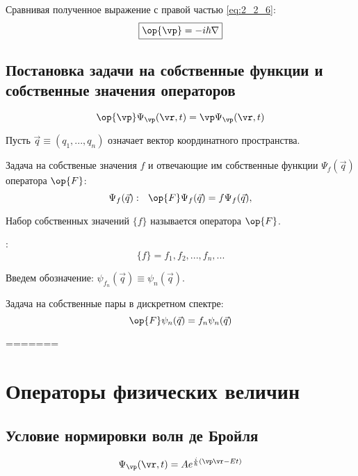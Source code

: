 Сравнивая полученное выражение с правой частью \eqref{eq:2_2_6}:
\begin{equation}
\label{eq:2_2_7}
\boxed{ \op{\vp} = -i\hbar\nabla }
\end{equation}

\section{Постановка задачи на собственные функции и собственные значения операторов}

\begin{equation}
\label{eq:2_3_1}
\op{\vp} \Psi_\vp(\vr,t) = \vp \Psi_\vp(\vr,t)
\end{equation}

Пусть $\vec{q}\equiv(q_1,...,q_n)$ означает вектор координатного пространства.

Задача на собственые значения $f$ и отвечающие им собственные функции $\Psi_f(\vec{q})$ оператора $\op{F}$: 
\begin{equation}
\label{eq:2_3_2}
\Psi_f(\vec{q}):~~ \op{F}\Psi_f(\vec{q}) = f \Psi_f(\vec{q}), 
\end{equation}

\begin{defn}
Набор собственных значений $\{f\}$ называется  оператора $\op{F}$.
\end{defn}

:
$$\{f\} = f_1,f_2,...,f_n,... $$

Введем обозначение: $\psi_{f_n}(\vec{q}) \equiv \psi_n(\vec{q})$.

Задача на собственные пары в дискретном спектре:
\begin{equation}
\label{eq:2_3_3}
\op{F} \psi_n(\vec{q}) = f_n \psi_n(\vec{q})
\end{equation}

=======
\chapter{Операторы физических величин}

\section{Условие нормировки волн де Бройля}

\begin{equation}
\label{eq:2_1_1}
\Psi_{\vp}(\vr,t) = A e^{\frac{i}{\hbar}(\vp\vr-Et)}
\end{equation}

